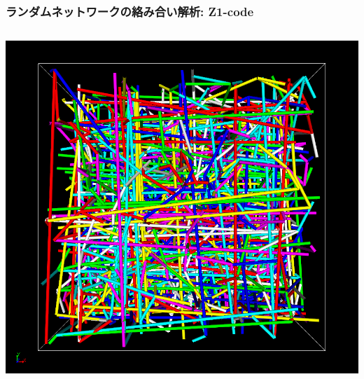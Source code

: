 \documentclass[12pt, dvipdfmx]{beamer}
\begin{document}
\begin{frame}
    \frametitle{ランダムネットワークの絡み合い解析: Z1-code}
        \vspace{-2mm}
        \begin{columns}[onlytextwidth]
                \includegraphics[width=.9\textwidth]{z_cord_4Chain.png}


\end{columns}
\end{frame}
\end{document}
